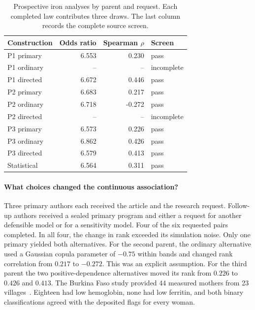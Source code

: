 \begin{table}[H]
\caption{Prospective iron analyses by parent and request. Each completed law contributes three draws. The last column records the complete source screen.}
\label{tab:ironprospective}
\centering
\begin{tabular}{@{}lrrl@{}}
\toprule
Construction & Odds ratio & Spearman $\rho$ & Screen\\
\midrule
P1 primary & 6.553 & 0.230 & pass\\
P1 ordinary & -- & -- & incomplete\\
P1 directed & 6.672 & 0.446 & pass\\
P2 primary & 6.683 & 0.217 & pass\\
P2 ordinary & 6.718 & -0.272 & pass\\
P2 directed & -- & -- & incomplete\\
P3 primary & 6.573 & 0.226 & pass\\
P3 ordinary & 6.862 & 0.426 & pass\\
P3 directed & 6.579 & 0.413 & pass\\
Statistical & 6.564 & 0.311 & pass\\
\bottomrule
\end{tabular}
\end{table}

\paragraph{What choices changed the continuous association?}
Three primary authors each received the article and the research request. Follow-up authors received a sealed primary program and either a request for another defensible model or for a sensitivity model. Four of the six requested pairs completed. In all four, the change in rank exceeded its simulation noise. Only one primary yielded both alternatives. For the second parent, the ordinary alternative used a Gaussian copula parameter of $-0.75$ within bands and changed rank correlation from $0.217$ to $-0.272$. This was an explicit assumption. For the third parent the two positive-dependence alternatives moved its rank from $0.226$ to $0.426$ and $0.413$. The Burkina Faso study provided 44 measured mothers from 23 villages~\cite{burkina_iron}. Eighteen had low hemoglobin, none had low ferritin, and both binary classifications agreed with the deposited flags for every woman.

